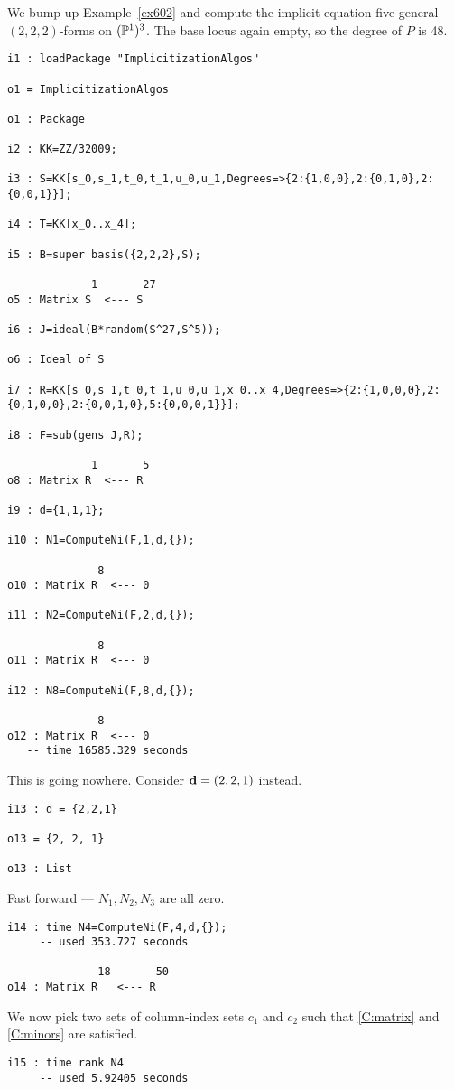 \documentclass[fleqn,reqno]{amsart}
\numberwithin{first}{chapter}
\begin{document}
\begin{example}[$\mt{ex603}$]
\label{ex603}
We bump-up Example~\ref{ex602} and compute the implicit equation five general
$(2,2,2)$-forms on $(\mathbb{P}^1)^3$. The base locus again empty, so the degree of $P$ is 48.
\begin{verbatim}
i1 : loadPackage "ImplicitizationAlgos"

o1 = ImplicitizationAlgos

o1 : Package

i2 : KK=ZZ/32009;

i3 : S=KK[s_0,s_1,t_0,t_1,u_0,u_1,Degrees=>{2:{1,0,0},2:{0,1,0},2:{0,0,1}}];

i4 : T=KK[x_0..x_4];

i5 : B=super basis({2,2,2},S);

             1       27
o5 : Matrix S  <--- S

i6 : J=ideal(B*random(S^27,S^5));

o6 : Ideal of S

i7 : R=KK[s_0,s_1,t_0,t_1,u_0,u_1,x_0..x_4,Degrees=>{2:{1,0,0,0},2:{0,1,0,0},2:{0,0,1,0},5:{0,0,0,1}}];

i8 : F=sub(gens J,R);

             1       5
o8 : Matrix R  <--- R

i9 : d={1,1,1};

i10 : N1=ComputeNi(F,1,d,{});

              8
o10 : Matrix R  <--- 0

i11 : N2=ComputeNi(F,2,d,{});

              8
o11 : Matrix R  <--- 0

i12 : N8=ComputeNi(F,8,d,{});

              8
o12 : Matrix R  <--- 0
   -- time 16585.329 seconds
\end{verbatim}
This is going nowhere.
Consider $\mathbf d=(2,2,1)$ instead.
\begin{verbatim}
i13 : d = {2,2,1}

o13 = {2, 2, 1}

o13 : List
\end{verbatim}
Fast forward --- $N_1, N_2, N_3$ are all zero.
\begin{verbatim}
i14 : time N4=ComputeNi(F,4,d,{});
     -- used 353.727 seconds

              18       50
o14 : Matrix R   <--- R
\end{verbatim}
We now pick two sets of column-index sets $c_1$ and $c_2$ such that
\eqref{C:matrix} and \eqref{C:minors} are satisfied.
\begin{verbatim}
i15 : time rank N4
     -- used 5.92405 seconds


\end{verbatim}
\end{example}
\end{document}
